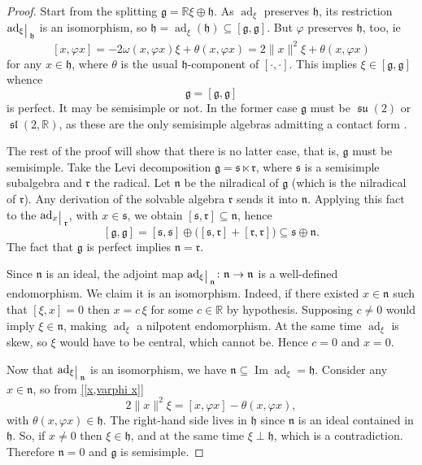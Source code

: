 \documentclass[12pt, twoside]{amsart}
\def\g{\mathfrak{g}}
\def\h{\mathfrak{h}}
\def\n{\mathfrak{n}}
\def\s{\mathfrak s}
\def\r{\mathfrak{r}}
\def\R{\mathbb{R}}
\def\ad{\operatorname{ad}}
\renewcommand{\Im}{\operatorname{Im}}
\newcommand{\lie}[1]{\mathfrak{#1}}
\DeclareMathOperator{\slie}{\lie{sl}}
\DeclareMathOperator{\su}{\lie{su}}
\newcommand{\restr}{\raisebox{-.2em}{$\!\big\arrowvert$}}
\theoremstyle{definition}
\begin{document}
\begin{proof}
Start from the splitting $\g = \R \xi \oplus \h$. As $\ad_\xi$ preserves $\h$, 
its restriction ${\ad_{\xi}}\restr_{\h }$ is an isomorphism, so 
    $\h= \ad _{\xi} ( \h)  \subseteq [\g , \g]$.
But $\varphi$ preserves $\h$, too, ie 
\begin{equation}\label{[x,varphi x]}
    [x,\varphi x]=-2\omega(x,\varphi x)\xi + \theta(x,\varphi x)=2\|x\|^2 \xi + \theta(x,\varphi x)
\end{equation}
for any $x\in\h$, where $\theta$ is the usual $\h$-component of $[\cdot,\cdot]$. This implies $\xi \in [\g,\g]$ whence 
$$\g = [\g, \g]$$ 
 is perfect. It may be semisimple or not. In the former case $\g$ must be $\su(2)$ or $\slie(2, \R)$, as these are the only semisimple algebras admitting a contact form  \cite[Theorem 5]{B}.\par
\quad The rest of the proof will show that there is no latter case, that is, $\g$ must be semisimple. 
Take the Levi decomposition $\g = \s \ltimes \r$, where $\s$ is a semisimple subalgebra and $\r$ the radical. Let $\n$ be the nilradical of $\g$ (which is the nilradical of $\r$). Any derivation of the solvable algebra $\r$ sends it into $\n$. Applying this fact to the ${\ad_x}\restr_{\r}$, with $x\in \s$, we obtain $[\s, \r] \subseteq \n$, hence  
\[  [\g, \g]= [\s, \s] \oplus \big([ \s, \r] + [\r, \r]\big) \subseteq \s \oplus \n. \]
The fact that $\g$ is perfect implies $\n=\r$. \par
\quad Since $\n$ is an ideal, the adjoint map ${\ad_{\xi}}\restr_{{\n}}\colon \n \to \n$ is a well-defined endomorphism.  We claim it is an isomorphism.
Indeed, if there existed $x \in \n$ such that  $[\xi, x] =0$ then $x = c\, \xi$ for some $c \in \R$ by hypothesis.  Supposing $c\neq 0$ would imply $\xi \in \n$, making $\ad_{\xi}$ a nilpotent endomorphism. At the same time $\ad_\xi$ is skew, so 
$\xi$ would have to be central, which cannot be. Hence $c=0$ and  $x=0$.  \par
\quad Now that ${\ad_{\xi}}\restr_{\n}$ is an isomorphism, we have $\n \subseteq \Im \ad_{\xi}=\h$. 
Consider any $x \in \n$, so from \eqref{[x,varphi x]} 
$$
2\|x\|^2 \xi =[x ,\varphi x] - \theta (x, \varphi x),
$$
with $\theta (x, \varphi x)\in \h$. The right-hand side lives in $\h$ since $\n$ is an ideal contained in $\h$. So, if $x\neq 0$ then   $\xi \in \h$, and at the same time $\xi \perp \h$, which is a contradiction. Therefore $\n=0$ and $\g$ is semisimple. 
\end{proof}
\end{document}
